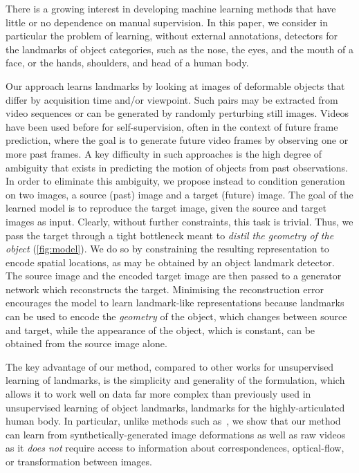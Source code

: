\documentclass{article}
\begin{document}
There is a growing interest in developing machine learning methods that have little or no dependence on manual supervision. In this paper, we consider in particular the problem of learning, without external annotations, detectors for the landmarks of object categories, such as the nose, the eyes, and the mouth of a face, or the hands, shoulders, and head of a human body.

Our approach learns landmarks by looking at images of deformable objects that differ by acquisition time and/or viewpoint. Such pairs may be extracted from video sequences or can be generated by randomly perturbing still images. Videos have been used before for self-supervision, often in the context of future frame prediction, where the goal is to generate future video frames by observing one or more past frames. A key difficulty in such approaches is the high degree of ambiguity that exists in predicting the motion of objects from past observations. In order to eliminate this ambiguity, we propose instead to condition generation on two images, a source (past) image and a target (future) image. The goal of the learned model is to reproduce the target image, given the source and target images as input. Clearly, without further constraints, this task is trivial. Thus, we pass the target through a tight bottleneck meant to \emph{distil the geometry of the object} (\cref{fig:model}). We do so by constraining the resulting representation to encode spatial locations, as may be obtained by an object landmark detector. The source image and the encoded target image are then passed to a generator network which reconstructs the target. Minimising the reconstruction error encourages the model to learn landmark-like representations because landmarks can be used to encode the \emph{geometry} of the object, which changes between source and target, while the appearance of the object, which is constant, can be obtained from the source image alone.

The key advantage of our method, compared to other works for unsupervised learning of landmarks, is the simplicity and generality of the formulation, which allows it to work well on data far more complex than previously used in unsupervised learning of object landmarks, \eg landmarks for the highly-articulated human body.
In particular, unlike methods such as~\cite{thewlis17unsupervised,thewlis17Bunsupervised,zhang2018unsupervised}, we show that our method can learn from synthetically-generated image deformations as well as raw videos as it \emph{does not} require access to information about correspondences, optical-flow, or transformation between images.
\end{document}
